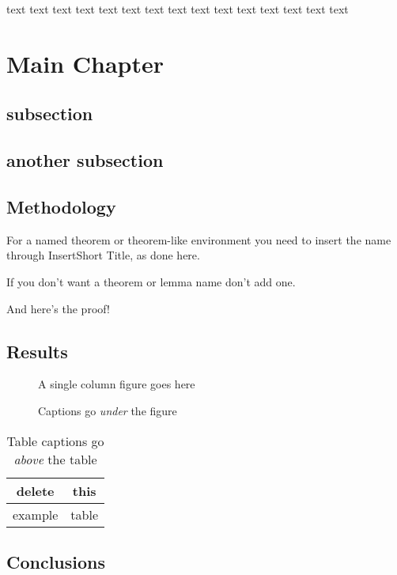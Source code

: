 \documentclass{ua_wgs_base}
\begin{document}
text text text text text text text text text text text text text text
text

\chapter{Main Chapter}

\section{subsection}

\section{another subsection}

\section{Methodology}

For a named theorem or theorem-like environment you need to insert
the name through \textsf{Insert\lyxarrow{}Short Title}, as done here.

If you don't want a theorem or lemma name don't add one.

And here's the proof!

\section{Results}

\begin{figure}[htbp]
\begin{centering}
\textsf{A single column figure goes here}
\par\end{centering}
\caption{Captions go \emph{under} the figure}
\end{figure}
\begin{table}[htbp]
\caption{Table captions go \emph{above} the table}

\centering{}%
\begin{tabular}{|c|c|}
\hline 
delete & this\tabularnewline
\hline 
\hline 
example & table\tabularnewline
\hline 
\end{tabular}
\end{table}


\section{Conclusions}
\end{document}
